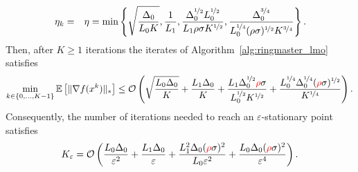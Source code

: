 \documentclass{article}
\begin{document}
\begin{theorem}
\begin{itemize}
\begin{eqnarray*}
            \eta_k &=& \eta = \min\left\{\sqrt{\frac{\Delta_0}{L_0 K}}, \frac{1}{L_1}, \frac{\Delta_0^{\nicefrac{1}{2}}L_0^{\nicefrac{1}{2}}}{L_1\rho\sigma K^{\nicefrac{1}{2}}},  \frac{\Delta_0^{\nicefrac{3}{4}}}{ L_0^{\nicefrac{1}{4}}(\rho\sigma)^{\nicefrac{1}{2}} K^{\nicefrac{3}{4}}}\right\}.
        \end{eqnarray*} 
        Then, after $K \ge 1$ iterations the iterates of Algorithm~\ref{alg:ringmaster_lmo} satisfies 
        \begin{equation*}
            \min_{k \in \{0,\dots, K-1\}} {\mathbb{E}}\left[\|\nabla f(x^k)\|_*\right] \leq \mathcal{O}\left(\sqrt{\frac{L_0\Delta_0}{K}} + \frac{L_1\Delta_0}{K} + \frac{L_1 \Delta^{\nicefrac{1}{2}}_0 {\color{red}\rho }\sigma}{L_0^{\nicefrac{1}{2}}K^{\nicefrac{1}{2}}} + \frac{L_0^{\nicefrac{1}{4}}\Delta_0^{\nicefrac{1}{4}}({\color{red} \rho}\sigma)^{\nicefrac{1}{2}}}{K^{\nicefrac{1}{4}}}\right).
        \end{equation*}
        Consequently, the number of iterations needed to reach an $\varepsilon$-stationary point satisfies
        \begin{equation*}
            K_{\varepsilon} = \mathcal{O}\left(\frac{L_0\Delta_0 }{\varepsilon^2}+ \frac{L_1\Delta_0 }{\varepsilon} + \frac{L_1^2\Delta_0({\color{red}\rho }\sigma)^2}{L_0\varepsilon^2} + \frac{L_0\Delta_0({\color{red}\rho }\sigma)^2}{\varepsilon^4}\right).
        \end{equation*}
    \end{itemize}
\end{theorem}
\end{document}
